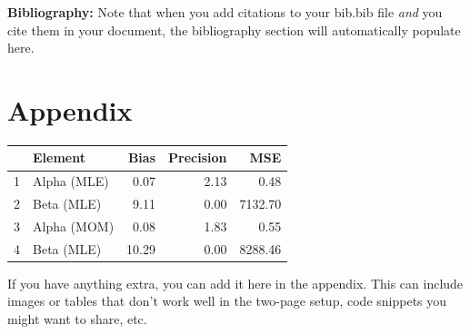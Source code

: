 \documentclass{article}\usepackage[]{graphicx}\usepackage[]{xcolor}
\begin{document}
\begin{multicols}{2}
\vspace{2em}

\noindent\textbf{Bibliography:} Note that when you add citations to your bib.bib file \emph{and}
you cite them in your document, the bibliography section will automatically populate here.

\begin{tiny}

\end{tiny}
\end{multicols}

\newpage
\onecolumn
\section{Appendix}
\begin{table}[ht]
\centering
\begin{tabular}{rlrrr}
  \hline
 & Element & Bias & Precision & MSE \\ 
  \hline
1 & Alpha (MLE) & 0.07 & 2.13 & 0.48 \\ 
  2 & Beta (MLE) & 9.11 & 0.00 & 7132.70 \\ 
  3 & Alpha (MOM) & 0.08 & 1.83 & 0.55 \\ 
  4 & Beta (MLE) & 10.29 & 0.00 & 8288.46 \\ 
   \hline
\end{tabular}
\end{table}
If you have anything extra, you can add it here in the appendix. This can include images or tables that don't work well in the two-page setup, code snippets you might want to share, etc.
\end{document}
